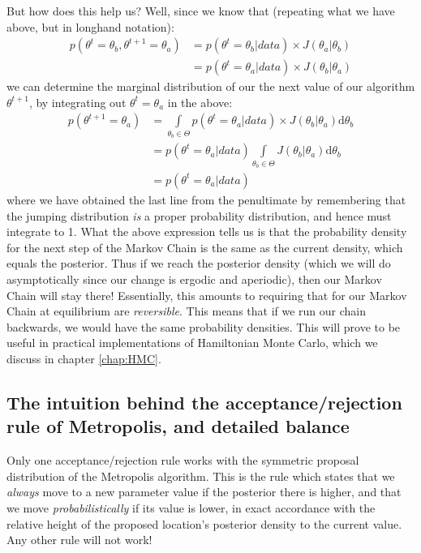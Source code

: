 \documentclass[11pt,fullpage]{book}
\begin{document}
But how does this help us? Well, since we know that (repeating what we have above, but in longhand notation):
%
\begin{equation}
\begin{align}
p(\theta^{t} = \theta_b,\theta^{t+1}=\theta_a) &=  p(\theta^t=\theta_b|data)\times J(\theta_a|\theta_b)\\
&= p(\theta^t=\theta_a|data)\times J(\theta_b|\theta_a)
\end{align}
\end{equation}
%
we can determine the marginal distribution of our the next value of our algorithm $\theta^{t+1}$, by integrating out $\theta^t=\theta_a$ in the above:
%
\begin{equation}
\begin{align}
p(\theta^{t+1}=\theta_a) &=  \int\limits_{\theta_b\in\Theta} p(\theta^t=\theta_a|data)\times J(\theta_b|\theta_a) \mathrm{d}\theta_b\\
&= p(\theta^t=\theta_a|data)\int\limits_{\theta_b\in\Theta}J(\theta_b|\theta_a) \mathrm{d}\theta_b\\
&= p(\theta^t=\theta_a|data)
\end{align}
\end{equation}
%
where we have obtained the last line from the penultimate by remembering that the jumping distribution \textit{is} a proper probability distribution, and hence must integrate to 1. What the above expression tells us is that the probability density for the next step of the Markov Chain is the same as the current density, which equals the posterior. Thus if we reach the posterior density (which we will do asymptotically since our change is ergodic and aperiodic), then our Markov Chain will stay there!  Essentially, this amounts to requiring that for our Markov Chain at equilibrium are \textit{reversible}. This means that if we run our chain backwards, we would have the same probability densities. This will prove to be useful in practical implementations of Hamiltonian Monte Carlo, which we discuss in chapter \ref{chap:HMC}.

\subsection{The intuition behind the acceptance/rejection rule of Metropolis, and detailed balance}
Only one acceptance/rejection rule works with the symmetric proposal distribution of the Metropolis algorithm. This is the rule which states that we \textit{always} move to a new parameter value if the posterior there is higher, and that we move \textit{probabilistically} if its value is lower, in exact accordance with the relative height of the proposed location's posterior density to the current value. Any other rule will not work!
\end{document}

